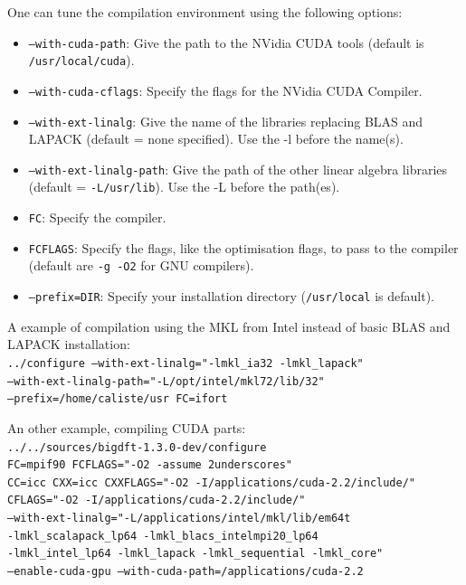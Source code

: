 \documentclass[a4paper,11pt]{report}
\begin{document}
One can tune the compilation environment using the following options:
\begin{itemize}
  \item \texttt{--with-cuda-path}: Give the path to the NVidia CUDA tools (default is \texttt{/usr/local/cuda}).
  \item \texttt{--with-cuda-cflags}: Specify the flags for the NVidia CUDA Compiler.
  \item \texttt{--with-ext-linalg}: Give the name of the libraries replacing BLAS and LAPACK (default = none specified). Use the -l before the name(s).
  \item \texttt{--with-ext-linalg-path}: Give the path of the other linear algebra libraries (default = \texttt{-L/usr/lib}). Use the -L before the path(es).
  \item \texttt{FC}: Specify the compiler.
  \item \texttt{FCFLAGS}: Specify the flags, like the
optimisation flags, to pass to the compiler (default are \texttt{-g
-O2} for GNU compilers).
  \item \texttt{--prefix=DIR}: Specify your installation directory (\texttt{/usr/local} is default).
\end{itemize}

A example of compilation using the MKL from Intel instead of basic BLAS and LAPACK installation:\\
\texttt{../configure --with-ext-linalg="-lmkl\_ia32 -lmkl\_lapack"\\
   --with-ext-linalg-path="-L/opt/intel/mkl72/lib/32"\\
   --prefix=/home/caliste/usr FC=ifort}

\smallskip

An other example, compiling CUDA parts:\\
\texttt{../../sources/bigdft-1.3.0-dev/configure\\
  FC=mpif90 FCFLAGS="-O2  -assume 2underscores"\\
  CC=icc CXX=icc CXXFLAGS="-O2  -I/applications/cuda-2.2/include/"\\
  CFLAGS="-O2  -I/applications/cuda-2.2/include/"\\
  --with-ext-linalg="-L/applications/intel/mkl/lib/em64t\\
                     -lmkl\_scalapack\_lp64 -lmkl\_blacs\_intelmpi20\_lp64\\
                     -lmkl\_intel\_lp64 -lmkl\_lapack -lmkl\_sequential -lmkl\_core"\\
  --enable-cuda-gpu --with-cuda-path=/applications/cuda-2.2}
\end{document}
